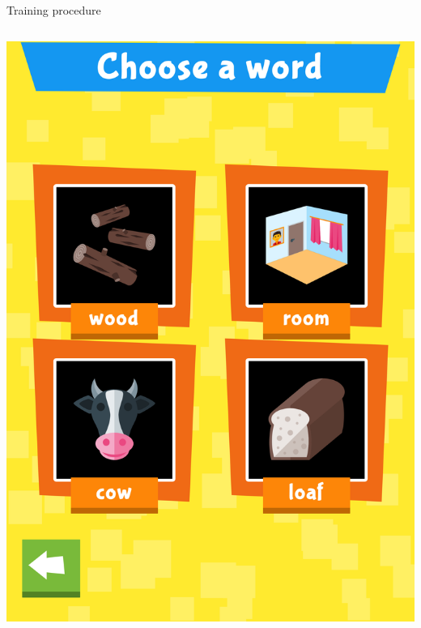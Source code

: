 \documentclass[final,xcolor={cmyk,hyperref}]{beamer}
\begin{document}
\begin{frame}[t]
\begin{columns}[t]
\begin{column}{0.45\linewidth}
\begin{block}{Training procedure}
\begin{columns}
\begin{column}{\screenshotwidth}
    \includegraphics[width=\linewidth]{images/CALVin-screenshots/jpgs/choose_word}
  \end{column}
\end{columns}
\vspace*{1ex}
\begin{columns}
  \begin{column}{\screenshotwidth}

\end{column}
\end{columns}
\end{block}
\end{column}
\end{columns}
\end{frame}
\end{document}
